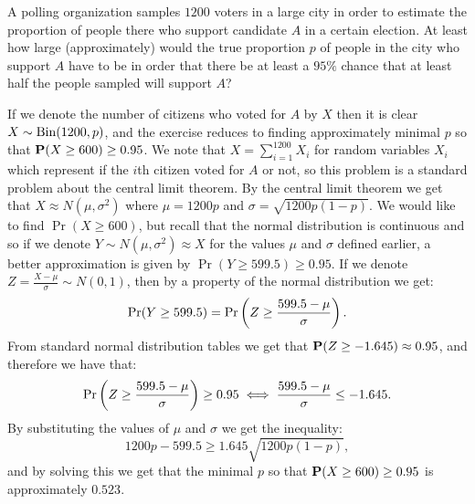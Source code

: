 \documentclass[11pt,a4paper]{article}
\begin{document}
\begin{exercise}
  A polling organization samples $1200$ voters in a large city in order to
  estimate the proportion of people there who support candidate $A$ in a certain
  election. 
  At least how large (approximately) would the true proportion $p$ of
  people in the city who support $A$ have to be in order that there be at least
  a $95\%$ chance that at least half the people sampled will support $A$?
\end{exercise}
\begin{solution}
  If we denote the number of citizens who voted for $A$ by $X$
  then it is clear $X \sim \operatorname{Bin}(1200,p)$,
  and the exercise reduces to finding approximately minimal $p$
  so that $\mathbf{P}(X \geq 600) \geq 0.95$.
  We note that $X = \sum_{i=1}^{1200} X_i$ for random variables $X_i$
  which represent if the $i$th citizen voted for $A$ or not,
  so this problem is a standard problem about the central limit theorem.
  By the central limit theorem we get that $X \approx N(\mu,\sigma^2)$
  where $\mu = 1200p$ and $\sigma = \sqrt{1200 p (1 - p)}$.
  We would like to find $\Pr(X \geq 600)$,
  but recall that the normal distribution is continuous
  and so if we denote $Y \sim N(\mu,\sigma^2) \approx X$
  for the values $\mu$ and $\sigma$ defined earlier,
  a better approximation is given by $\Pr(Y \geq 599.5) \geq 0.95$.
  If we denote $Z = \frac{X - \mu}{\sigma} \sim N(0,1)$,
  then by a property of the normal distribution we get:
  \[
    \Pr(Y \geq 599.5) =
    \Pr\del{Z \geq \frac{599.5 - \mu}{\sigma}}.
  \]
  From standard normal distribution tables
  we get that $\mathbf{P}(Z \geq -1.645) \approx 0.95$,
  and therefore we have that:
  \[
    \Pr\del{Z \geq \frac{599.5 - \mu}{\sigma}} \geq 0.95 \iff
    \frac{599.5 - \mu}{\sigma} \le -1.645.
  \]
  By substituting the values of $\mu$ and $\sigma$ we get the inequality:
  \[
    1200p - 599.5 \geq 1.645 \sqrt{1200 p (1 - p)},
  \]
  and by solving this we get that the minimal $p$
  so that $\mathbf{P}(X \geq 600) \geq 0.95$ is approximately $0.523$.
\end{solution}
\end{document}
